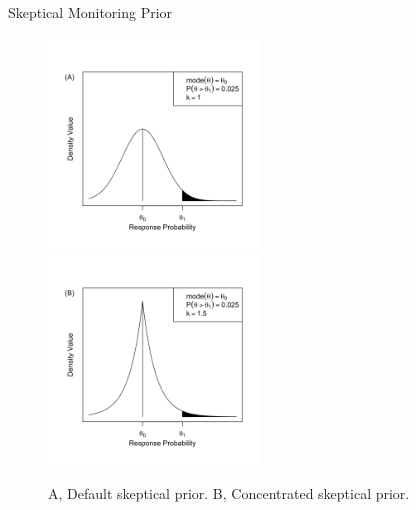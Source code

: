 \documentclass{beamer}
\begin{document}

\begin{frame}{Skeptical Monitoring Prior}
\begin{figure}[htbp]
\begin{center}
\includegraphics[width=0.5\textwidth]{./figures/figure1a.png}%
\includegraphics[width=0.5\textwidth]{./figures/figure1b.png}
\caption{A, Default skeptical prior. B, Concentrated skeptical prior.}

\label{fig:figure1}
\end{center}
\end{figure}
\end{frame}
\end{document}
